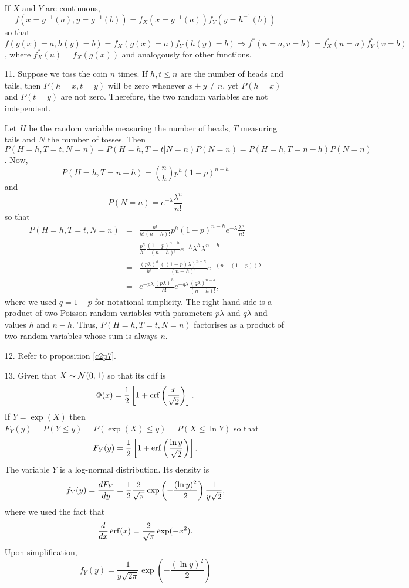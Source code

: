 \documentclass{article}
\begin{document}
\begin{enumerate}
If $X$ and $Y$ are continuous, 
\[
f(x=g^{-1}(a), y=g^{-1}(b)) = f_X(x=g^{-1}(a))f_Y(y=h^{-1}(b)) 
\]
so that $f(g(x)=a, h(y)=b) = f_X(g(x)=a)f_Y(h(y)=b) 
\Rightarrow f^\ast(u=a, v=b) = f_X^\ast(u=a)f_Y^\ast(v=b)$, where $f_X^\ast(u)
= f_X(g(x))$ and analogously for other functions.

\item[11.] Suppose we toss the coin $n$ times. If $h, t \le n$ are the number of 
heads and tails, then $P(h = x, t = y)$ will be zero whenever $x + y \ne n$, yet
$P(h = x)$ and $P(t = y)$ are not zero. Therefore, the two random variables are 
not independent.

Let $H$ be the random variable measuring the number of heads, $T$ measuring tails
and $N$ the number of tosses. Then $P(H = h, T = t, N = n) = P(H=h, T=t|N=n)
P(N=n) = P(H=h, T=n-h)P(N=n)$. Now,
\[
P(H=h, T=n-h) = \binom{n}{h}p^{h}(1 - p)^{n-h}
\]
and
\[
P(N=n) = e^{-\lambda}\frac{\lambda^n}{n!}
\]
so that
\begin{eqnarray*}
P(H = h, T = t, N = n) &=& 
	\frac{n!}{h!(n-h)!}p^h(1-p)^{n-h}e^{-\lambda}\frac{\lambda^n}{n!} \\
 &=& \frac{p^h}{h!}\frac{(1-p)^{n-h}}{(n-h)!} e^{-\lambda}\lambda^h \lambda^{n-h} \\
 &=& \frac{(p\lambda)^h}{h!}\frac{((1-p)\lambda)^{n-h}}{(n-h)!}e^{-(p + (1 - p))\lambda} \\
 &=& e^{-p\lambda}\frac{(p\lambda)^h}{h!} e^{-q\lambda}\frac{(q\lambda)^{n-h}}{(n-h)!},
\end{eqnarray*}
where we used $q = 1 - p$ for notational simplicity. The right hand side is a 
product of two Poisson random variables with parameters $p\lambda$ and $q\lambda$
and values $h$ and $n - h$. Thus, $P(H=h, T=t, N=n)$ factorises as a product of
two random variables whose sum is always $n$.

\item[12.] Refer to proposition \ref{c2p7}.

\item[13.] Given that $X \sim \mathcal{N}(0, 1)$ so that its cdf is
\[
\Phi(x) = \frac{1}{2}\left[1 + \operatorname{erf}\left(\frac{x}{\sqrt{2}}\right)\right].
\]
If $Y = \exp(X)$ then $F_Y(y) = P(Y \le y) = P(\exp(X) \le y) = P(X \le \ln Y)$
so that
\begin{equation}\label{c2e28}
F_Y(y) = \frac{1}{2}\left[1 + \operatorname{erf}\left(\frac{\ln y}{\sqrt{2}}\right)\right].
\end{equation}
The variable $Y$ is a log-normal distribution. Its density is
\[
f_Y(y) = \frac{d{F_Y}}{d{y}} = 
\frac{1}{2}\frac{2}{\sqrt{\pi}}\exp\left(-\frac{(\ln y)^2}{2}\right)
\frac{1}{y\sqrt{2}},
\]
where we used the fact that
\[
\frac{d}{dx}\operatorname{erf}(x) = \frac{2}{\sqrt{\pi}}\exp(-x^2).
\]
Upon simplification,
\begin{equation}\label{c2e29}
f_Y(y) = \frac{1}{y\sqrt{2\pi}}\exp\left(-\frac{(\ln y)^2}{2}\right)
\end{equation}


\end{enumerate}
\end{document}

